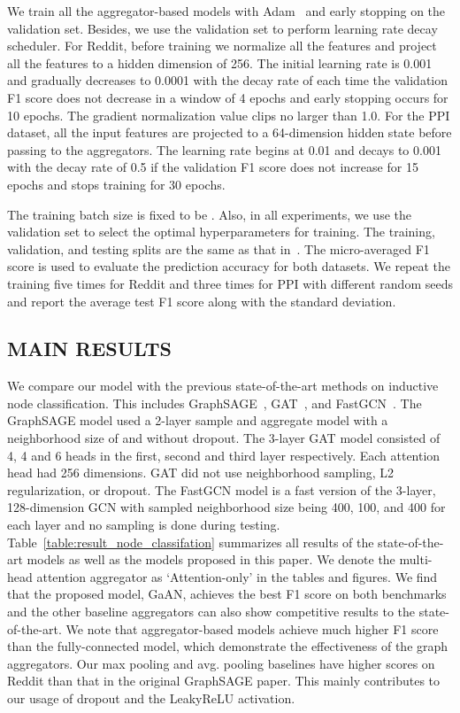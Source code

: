 \documentclass{article}
\begin{document}
	
	We train all the aggregator-based models with Adam~\citep{kingma2014adam} and early stopping on the validation set. Besides, we use the validation set to perform learning rate decay scheduler.  For Reddit, before training we normalize all the features and project all the features to a hidden dimension of 256. The initial learning rate is 0.001 and gradually decreases to 0.0001 with the decay rate of  each time the validation F1 score does not decrease in a window of 4 epochs and early stopping occurs for 10 epochs. The gradient normalization value clips no larger than 1.0. 
	For the PPI dataset, all the input features are projected to a 64-dimension hidden state before passing to the aggregators. The learning rate begins at 0.01 and decays to 0.001 with the decay rate of 0.5 if the validation F1 score does not increase for 15 epochs and stops training for 30 epochs. 
	
	The training batch size is fixed to be . Also, in all experiments, we use the validation set to select the optimal hyperparameters for training. The training, validation, and testing splits are the same as that in~\citep{hamilton2017inductive}. The micro-averaged F1 score is used to evaluate the prediction accuracy for both datasets. We repeat the training five times for Reddit and three times for PPI with different random seeds and report the average test F1 score along with the standard deviation.
	
	
	
	
	\subsection{MAIN RESULTS}
	
	We compare our model with the previous state-of-the-art methods on inductive node classification. 
	This includes GraphSAGE~\citep{hamilton2017inductive}, GAT~\citep{velivckovic2017graph},
	and FastGCN~\citep{chen2018fastgcn}. 
	The GraphSAGE model used a 2-layer sample and aggregate model with a neighborhood size of  and  without dropout. 
	The 3-layer GAT model consisted of 4, 4 and 6 heads in the first, second and third layer respectively. Each attention head had 256 dimensions. GAT did not use neighborhood sampling, L2 regularization, or dropout. 
	The FastGCN model is a fast version of the 3-layer, 128-dimension GCN with sampled neighborhood size being 400, 100, and 400 for each layer and no sampling is done during testing.
	Table~\ref{table:result_node_classifation} summarizes all results of the state-of-the-art models as well as the models proposed in this paper. We denote the multi-head attention aggregator as `Attention-only' in the tables and figures. We find that the proposed model, GaAN, achieves the best F1 score on both benchmarks and the other baseline aggregators can also show competitive results to the state-of-the-art. We note that aggregator-based models achieve much higher F1 score than the fully-connected model, which demonstrate the effectiveness of the graph aggregators. Our max pooling and avg. pooling baselines have higher scores on Reddit than that in the original GraphSAGE paper. This mainly contributes to our usage of dropout and the LeakyReLU activation.
	
\end{document}
